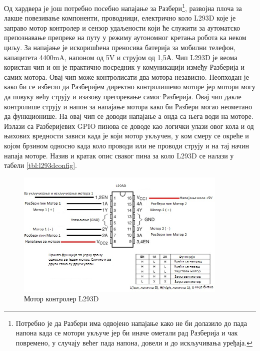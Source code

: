\documentclass[12pt,oneside]{memoir}
\theoremstyle{remark}
\begin{document}
Од хардвера је још потребно посебно напајање за Разбери\footnote{Потребно је да Разбери има одвојено напајање како не би долазило до пада напона када се мотори укључе јер би иначе ометали рад Разберија и чак повремено, у случају већег пада напона, довели и до искључивања уређаја.}, развојна плоча за лакше повезивање компоненти, проводници, електрично коло L293D које је заправо мотор контролер и сензор удаљености који ће служити за аутоматско препознавање препреке на путу у режиму аутономног кретања робота ка неком циљу. За напајање је искоришћена преносива батерија за мобилни телефон, капацитета 4400mA, напоном од 5V и струјом од 1,5А. Чип L293D је веома користан чип и он је практично посредник у комуникацији између Разберија и самих мотора. Овај чип може контролисати два мотора независно. Неопходан је како би се избегло да Разберијем директно контролишемо моторе јер мотори могу да повуку већу струју и изазову прегоревање самог Разберија. Овај чип дакле контролише струју и напон за напајање мотора како би Разбери могао неометано да функционише. На овај чип се доводи напајање а онда са њега води на моторе. Излази са Разберијевих GPIO пинова се доводе као логички улази овог кола и од њихових вредности зависи када је који мотор укључен, у ком смеру се окреће и којом брзином односно када коло проводи или не проводи струју и на тај начин напаја моторе. Назив и кратак опис сваког пина за коло L293D се налази у табели \ref{tbl:l293dconfig}.


\begin{figure}[!ht]
\centering
\includegraphics[width=0.9\textwidth]{slike/shemal293d.jpg}
\caption{Мотор контролер L293D}
\label{fig:l293d}
\end{figure}
\end{document}
